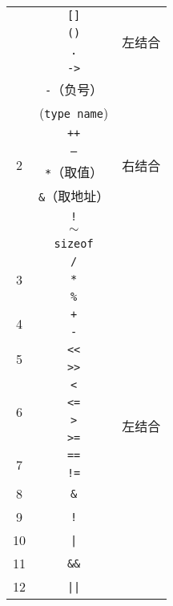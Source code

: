 \documentclass{article}
\begin{document}
\begin{longtable}{|c|c|c|}
    {\multirow{4}{*}{1}} 
     & \texttt{{[}{]}} & \multirow{4}{*}{左结合} \\ \cline{2-2}
     & \texttt{()} &  \\ \cline{2-2}
     & \texttt{.} &  \\ \cline{2-2}
     & \texttt{->} &  \\ \hline
    \multirow{9}{*}{2}
     & \texttt{-}（负号） & \multirow{9}{*}{右结合} \\ \cline{2-2}
     & (\texttt{type name}) &  \\ \cline{2-2}
     & \texttt{++} &  \\ \cline{2-2}
     & \texttt{--} &  \\ \cline{2-2}
     & \texttt{*}（取值） &  \\ \cline{2-2}
     & \texttt{\&}（取地址） &  \\ \cline{2-2}
     & \texttt{!} &  \\ \cline{2-2}
     & \texttt{$\sim$} &  \\ \cline{2-2}
     & \texttt{sizeof} &  \\ \hline
    \multirow{3}{*}{3} 
     & \texttt{/} & \multirow{18}{*}{左结合} \\ \cline{2-2}
     & \texttt{*} &  \\ \cline{2-2}
     & \texttt{\%} &  \\ \cline{1-2}
    \multirow{2}{*}{4}
     & \texttt{+} &  \\ \cline{2-2}
     & \texttt{-} &  \\ \cline{1-2}
    \multirow{2}{*}{5} 
     & \texttt{{<}{<}} &  \\ \cline{2-2}
     & \texttt{{>}{>}} &  \\ \cline{1-2}
    \multirow{4}{*}{6} 
     & \texttt{<} &  \\ \cline{2-2}
     & \texttt{<=} &  \\ \cline{2-2}
     & \texttt{>} &  \\ \cline{2-2}
     & \texttt{>=} &  \\ \cline{1-2}
    \multirow{2}{*}{7} 
     & \texttt{==} &  \\ \cline{2-2}
     & \texttt{!=} &  \\ \cline{1-2}
    8 & \texttt{\&} &  \\ \cline{1-2}
    9 & \texttt{!} &  \\ \cline{1-2}
    10 & \texttt{|} &  \\ \cline{1-2}
    11 & \texttt{\&\&} &  \\ \cline{1-2}
    12 & \texttt{||} &  \\ \hline

\end{longtable}
\end{document}
